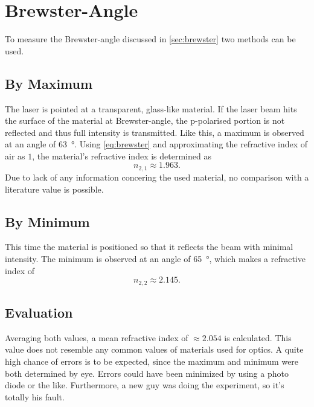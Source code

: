 \chapter{Brewster-Angle}
To measure the Brewster-angle discussed in \autoref{sec:brewster} two methods can be used.

\section{By Maximum}
The laser is pointed at a transparent, glass-like material.
If the laser beam hits the surface of the material at Brewster-angle, the p-polarised portion is not reflected and thus full intensity is transmitted.
Like this, a maximum is observed at an angle of \SI{63}{\degree}.
Using \autoref{eq:brewster} and approximating the refractive index of air as $1$, the material's refractive index is determined as
\begin{equation*}
	n_{2,1}\approx\num{1.963}.
\end{equation*}
Due to lack of any information concering the used material, no comparison with a literature value is possible.

\section{By Minimum}
This time the material is positioned so that it reflects the beam with minimal intensity.
The minimum is observed at an angle of \SI{65}{\degree}, which makes a refractive index of
\begin{equation*}
	n_{2,2}\approx\num{2.145}.
\end{equation*}

\section{Evaluation}
Averaging both values, a mean refractive index of $\approx\num{2.054}$ is calculated.
This value does not resemble any common values of materials used for optics.
A quite high chance of errors is to be expected, since the maximum and minimum were both determined by eye.
Errors could have been minimized by using a photo diode or the like.
Furthermore, a new guy was doing the experiment, so it's totally his fault.
